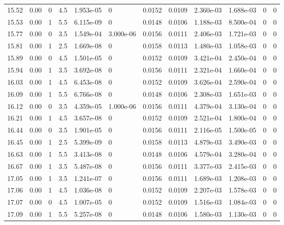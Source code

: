 \documentclass[preview]{standalone}
\begin{document}
{{{{{\begin{tabular}{L{1.2cm}C{1.2cm} C{0.3cm}C{0.5cm} C{1.4cm}C{1.4cm} C{1.4cm}C{1.4cm} C{1.6cm}C{1.6cm} C{1.6cm}C{1.6cm}}
  15.52  &  0.00  & 0     & 4.5 &  1.953e-05  & 0  &  0.0152&   0.0109& 2.360e-03 & 1.688e-03   &  0 & 0  \\ 
  15.53  &  0.00  & 1     & 5.5 &  6.115e-09  & 0  &  0.0148&   0.0106& 1.188e-03 & 8.500e-04   &  0 & 0  \\ 
  15.77  &  0.00  & 0     & 3.5 &  1.549e-04  & 3.000e-06  &  0.0156&   0.0111& 2.406e-03 & 1.721e-03   &  0 & 0  \\ 
  15.81  &  0.00  & 1     & 2.5 &  1.669e-08  & 0  &  0.0158&   0.0113& 1.480e-03 & 1.058e-03   &  0 & 0  \\ 
  15.89  &  0.00  & 0     & 4.5 &  1.501e-05  & 0  &  0.0152&   0.0109& 3.421e-04 & 2.450e-04   &  0 & 0  \\ 
  15.94  &  0.00  & 1     & 3.5 &  3.692e-08  & 0  &  0.0156&   0.0111& 2.321e-04 & 1.660e-04   &  0 & 0  \\ 
  16.03  &  0.00  & 1     & 4.5 &  6.453e-08  & 0  &  0.0152&   0.0109& 3.626e-04 & 2.590e-04   &  0 & 0  \\ 
  16.09  &  0.00  & 1     & 5.5 &  6.766e-08  & 0  &  0.0148&   0.0106& 2.308e-03 & 1.651e-03   &  0 & 0  \\ 
  16.12  &  0.00  & 0     & 3.5 &  4.359e-05  & 1.000e-06  &  0.0156&   0.0111& 4.379e-04 & 3.130e-04   &  0 & 0  \\ 
  16.21  &  0.00  & 1     & 4.5 &  3.657e-08  & 0  &  0.0152&   0.0109& 2.521e-04 & 1.800e-04   &  0 & 0  \\ 
  16.44  &  0.00  & 0     & 3.5 &  1.901e-05  & 0  &  0.0156&   0.0111& 2.116e-05 & 1.500e-05   &  0 & 0  \\ 
  16.45  &  0.00  & 1     & 2.5 &  5.399e-09  & 0  &  0.0158&   0.0113& 4.879e-03 & 3.490e-03   &  0 & 0  \\ 
  16.63  &  0.00  & 1     & 5.5 &  3.413e-08  & 0  &  0.0148&   0.0106& 4.579e-04 & 3.280e-04   &  0 & 0  \\ 
  16.67  &  0.00  & 1     & 3.5 &  5.487e-08  & 0  &  0.0156&   0.0111& 3.377e-03 & 2.415e-03   &  0 & 0  \\ 
  17.05  &  0.00  & 1     & 3.5 &  1.241e-07  & 0  &  0.0156&   0.0111& 1.689e-03 & 1.208e-03   &  0 & 0  \\ 
  17.06  &  0.00  & 1     & 4.5 &  1.036e-08  & 0  &  0.0152&   0.0109& 2.207e-03 & 1.578e-03   &  0 & 0  \\ 
  17.07  &  0.00  & 0     & 4.5 &  1.007e-05  & 0  &  0.0152&   0.0109& 1.516e-03 & 1.084e-03   &  0 & 0  \\ 
  17.09  &  0.00  & 1     & 5.5 &  5.257e-08  & 0  &  0.0148&   0.0106& 1.580e-03 & 1.130e-03   &  0 & 0  \\ 

\end{tabular}}}}}}
\end{document}
